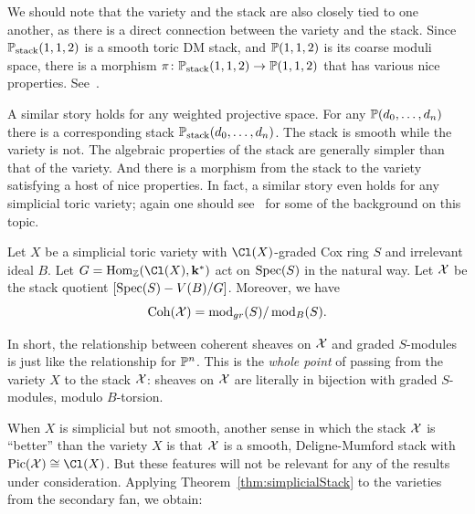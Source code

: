 \documentclass{amsart}
\begin{document}
We should note that the variety and the stack are also closely tied to one another, as there is a direct connection between the variety and the stack.  Since $\mathbb P_{\text{stack}}(1,1,2)$ is a smooth toric DM stack, and $\mathbb P(1,1,2)$ is its coarse moduli space, there is  a morphism $\pi\colon \mathbb P_{\text{stack}}(1,1,2) \to \mathbb P(1,1,2)$ that has various nice properties.  See~\cite{BorisovChenSmith2004}.

A similar story holds for any weighted projective space.  For any $\mathbb P(d_0, \dots, d_n)$ there is a corresponding stack $\mathbb P_{\text{stack}}(d_0, \dots, d_n)$.  The stack is smooth while the variety is not.  The algebraic properties of the stack are generally simpler than that of the variety.  And there is a morphism from the stack to the variety satisfying a host of nice properties.  In fact, a similar story even holds for any simplicial toric variety; again one should see~\cite{BorisovChenSmith2004} for some of the background on this topic.




\begin{thm}\label{thm:simplicialStack}
  Let $X$ be a simplicial toric variety with $\Cl(X)$-graded Cox ring $S$ and irrelevant ideal $B$.  Let $G=\Hom_{\ZZ}(\Cl(X),\kk^*)$ act on $\operatorname{Spec}(S)$ in the natural way.  Let $\mathcal X$ be the stack quotient $[\operatorname{Spec}(S) - V(B) / G]$.  Moreover, we have
  \[
  \operatorname{Coh}(\mathcal X) = \operatorname{mod}_{gr}(S)/\operatorname{mod}_{B}(S).
  \]
\end{thm}
In short, the relationship between coherent sheaves on $\mathcal X$ and graded $S$-modules is just like the relationship for $\mathbb P^n$.  This is the {\em whole point} of passing from the variety $X$ to the stack $\mathcal X$: sheaves on $\mathcal X$ are literally in bijection with graded $S$-modules, modulo $B$-torsion.


When $X$ is simplicial but not smooth, another sense in which the stack $\mathcal X$ is ``better'' than the variety $X$ is that $\mathcal X$ is a smooth, Deligne-Mumford stack with $\Pic(\sX) \cong \Cl(X)$.  But these features  will not be relevant for any of the results under consideration.  Applying Theorem~\ref{thm:simplicialStack} to the varieties from the secondary fan, we obtain:
\end{document}
